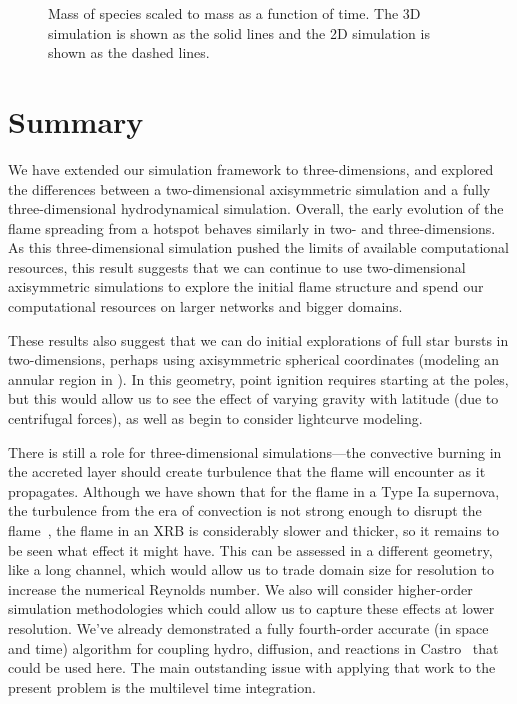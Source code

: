 \documentclass[linenumbers,trackchanges]{aastex631}
\newcommand{\castro}{{\sf Castro}}
\begin{document}
\begin{figure}[t]
\centering
{}
\caption{\label{fig:mass_plot} Mass of species scaled to 
  mass as a function of time.  The 3D simulation is shown as the solid
  lines and the 2D simulation is shown as the dashed lines.}
\end{figure}

\section{Summary}

We have extended our simulation framework to three-dimensions, and
explored the differences between a two-dimensional axisymmetric
simulation and a fully three-dimensional hydrodynamical simulation.
Overall, the early evolution of the flame spreading from a hotspot
behaves similarly in two- and three-dimensions.  As this
three-dimensional simulation pushed the limits of available
computational resources, this result suggests that we can continue to
use two-dimensional axisymmetric simulations to explore the initial
flame structure and spend our computational resources on larger networks
and bigger domains.

These results also suggest that we can do initial explorations of full
star bursts in two-dimensions, perhaps using axisymmetric spherical
coordinates (modeling an annular region in ).  In this
geometry, point ignition requires starting at the poles, but this
would allow us to see the effect of varying gravity with latitude (due
to centrifugal forces), as well as begin to consider lightcurve modeling.

There is still a role for three-dimensional simulations---the
convective burning in the accreted layer should create turbulence that
the flame will encounter as it propagates.  Although we have shown
that for the flame in a Type Ia supernova, the turbulence from the
era of convection is not strong enough to disrupt the
flame~\citep{wdturb}, the flame in an XRB is considerably slower and
thicker, so it remains to be seen what effect it might have.  This can
be assessed in a different geometry, like a long channel, which would
allow us to trade domain size for resolution to increase the numerical
Reynolds number.  We also will consider higher-order simulation
methodologies which could allow us to capture these effects at lower
resolution.  We've already demonstrated a fully fourth-order accurate
(in space and time) algorithm for coupling hydro, diffusion, and
reactions in \castro~\citep{castro-sdc} that could be used here.  The
main outstanding issue with applying that work to the present problem
is the multilevel time integration.
\end{document}
